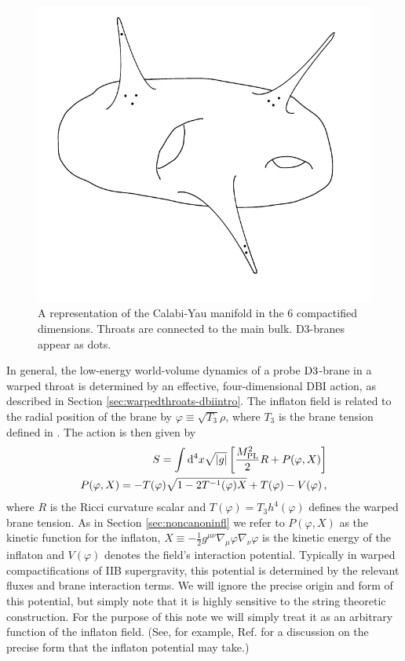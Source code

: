 % 
\begin{figure}
 \centering
 \includegraphics[width=\textwidth]{dbi/graphs/cymanifold}
 \caption[Calabi-Yau Manifold]{A representation of the Calabi-Yau manifold in the 6
compactified
dimensions. Throats are connected to the main bulk. D3-branes appear as dots.}
 \label{fig:braneworld}
\end{figure}
% 

In general, the low-energy world-volume dynamics
of a probe ${\rm D3}$-brane in a warped throat is determined 
by an effective, four-dimensional DBI action, as described in Section
\ref{sec:warpedthroats-dbiintro}.
The inflaton field is related to the radial 
position of the brane by 
$\varphi \equiv \sqrt{T_3} \rho$, where $T_3$ 
is the brane tension defined in . The action is
then given by \cite{brane6}
% 
\begin{eqnarray}
\label{eq:DBIaction-dbiintro}
S=\int  \mathrm{d}^4x \sqrt{|g|} \left[ \frac{M_{\mathrm{PL}}^2}{2} R 
+ P (\varphi , X) \right] \\
\label{eq:Pdefn-dbiintro}
P( \varphi ,X) = - T (\varphi)  \sqrt{1 - 2T^{-1} (\varphi ) X}
+T (\varphi)  -V(\varphi)  \,,
\end{eqnarray}
% 
where $R$ is the Ricci curvature scalar and $T(\varphi ) = T_3 h^4 (\varphi )$
defines the warped brane tension. As in Section \ref{sec:noncanoninfl} we refer
to $P(\varphi , X)$ as the kinetic function for the inflaton, 
$X \equiv - \frac{1}{2} g^{\mu\nu} \nabla_{\mu} \varphi \nabla_{\nu} \varphi$
is the kinetic energy of the inflaton and $V(\varphi )$ denotes 
the field's interaction 
potential. 
Typically in warped compactifications of 
IIB supergravity, this potential is determined by the 
relevant fluxes and brane interaction terms. 
We will ignore the precise origin
and form of this potential, but simply
note that it is highly sensitive to the string theoretic construction. For the
purpose of this note we will simply treat it 
as an arbitrary function of the inflaton field.
(See, for example, Ref. \cite{brane5} for a discussion 
on the precise form that the inflaton potential may take.)


